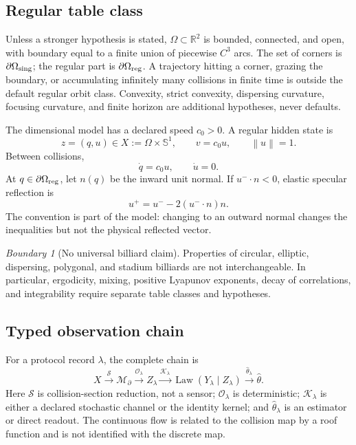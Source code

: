 \documentclass[11pt,a4paper]{article}
\theoremstyle{definition}
\theoremstyle{plain}
\theoremstyle{remark}
\newtheorem{warning}[definition]{Boundary}
\newcommand{\R}{\mathbb{R}}
\newcommand{\Sph}{\mathbb{S}}
\newcommand{\norm}[1]{\left\lVert #1\right\rVert}
\newcommand{\Ocal}{\mathcal O}
\newcommand{\Kcal}{\mathcal K}
\newcommand{\Scal}{\mathcal S}
\newcommand{\Mcal}{\mathcal M}
\begin{document}
\subsection{Regular table class}

Unless a stronger hypothesis is stated, \(\Omega\subset\R^2\) is
bounded, connected, and open, with boundary equal to a finite union of
piecewise \(C^3\) arcs. The set of corners is
\(\partial\Omega_{\rm sing}\); the regular part is
\(\partial\Omega_{\rm reg}\). A trajectory hitting a corner, grazing
the boundary, or accumulating infinitely many collisions in finite
time is outside the default regular orbit class. Convexity, strict
convexity, dispersing curvature, focusing curvature, and finite
horizon are additional hypotheses, never defaults.

The dimensional model has a declared speed \(c_0>0\). A regular hidden
state is
\[
z=(q,u)\in X:=\Omega\times\Sph^1,\qquad
v=c_0u,\qquad \norm{u}=1.
\]
Between collisions,
\begin{equation}\label{eq:free-flight}
\dot q=c_0u,\qquad \dot u=0.
\end{equation}
At \(q\in\partial\Omega_{\rm reg}\), let \(n(q)\) be the inward unit
normal. If \(u^-\cdot n<0\), elastic specular reflection is
\begin{equation}\label{eq:reflection}
u^+=u^- -2(u^-\cdot n)n.
\end{equation}
The convention is part of the model: changing to an outward normal
changes the inequalities but not the physical reflected vector.

\begin{warning}[No universal billiard claim]
Properties of circular, elliptic, dispersing, polygonal, and stadium
billiards are not interchangeable. In particular, ergodicity,
mixing, positive Lyapunov exponents, decay of correlations, and
integrability require separate table classes and hypotheses.
\end{warning}

\subsection{Typed observation chain}

For a protocol record \(\lambda\), the complete chain is
\begin{equation}\label{eq:observation-chain}
X\xrightarrow{\Scal}\Mcal_\partial
\xrightarrow{\Ocal_\lambda}Z_\lambda
\xrightarrow{\Kcal_\lambda}
\operatorname{Law}(Y_\lambda\mid Z_\lambda)
\xrightarrow{\widehat\theta_\lambda}\widehat\theta.
\end{equation}
Here \(\Scal\) is collision-section reduction, not a sensor;
\(\Ocal_\lambda\) is deterministic; \(\Kcal_\lambda\) is either a
declared stochastic channel or the identity kernel; and
\(\widehat\theta_\lambda\) is an estimator or direct readout. The
continuous flow is related to the collision map by a roof function
and is not identified with the discrete map.
\end{document}
